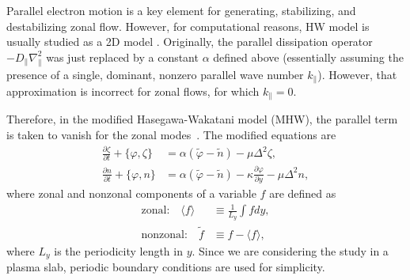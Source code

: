 \documentclass[12pt,lot, lof]{puthesis}
\begin{document}
Parallel electron motion is a key element for generating, stabilizing, and destabilizing zonal flow. However, for computational reasons, HW model is usually studied as a 2D model \cite{Smolyakov, Numata}. Originally, the parallel dissipation operator $-D_\parallel \nabla_\parallel^2$ was just replaced by a constant $\alpha$ defined above (essentially assuming the presence of a single, dominant, nonzero parallel wave number $k_\parallel$).  However, that approximation is incorrect for zonal flows, for which $k_\parallel = 0$.  

Therefore, in the modified Hasegawa-Wakatani model (MHW), the parallel term is taken to vanish for the zonal modes~\cite{Smolyakov}. The modified equations are
\begin{subequations}
\label{MHW1a}
\begin{align}
	\frac{\partial \zeta}{\partial t}  + \{\varphi , \zeta \} &= \alpha (\tilde{\varphi}-\tilde{n}) - \mu \Delta^2 \zeta \label{MHW1aa}	, \\	
	\frac{\partial n}{\partial t}  + \{\varphi , n\} &=  \alpha (\tilde{\varphi}-\tilde{n}) -\kappa \frac{\partial \varphi}{\partial y}- \mu \Delta^2 n,
\label{MHW1bb}	
\end{align}
\end{subequations}
%
where zonal and nonzonal components of a variable $f$ are defined as
\begin{subequations}
\begin{align}
\mbox{zonal:} \quad  \langle f  \rangle &\equiv \frac{1}{L_y} \int fdy, \\
 \mbox{nonzonal:} \quad   \tilde{f}  &\equiv f - \langle f  \rangle,
\end{align}
\end{subequations}
where $L_y$ is the periodicity length in $y$. Since we are considering the study in a plasma slab, periodic boundary conditions are used for simplicity.
\end{document}
